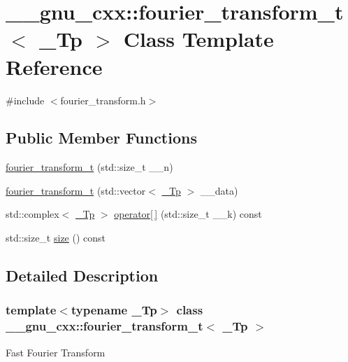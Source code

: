 \hypertarget{class____gnu__cxx_1_1fourier__transform__t}{}\section{\+\_\+\+\_\+gnu\+\_\+cxx\+:\+:fourier\+\_\+transform\+\_\+t$<$ \+\_\+\+Tp $>$ Class Template Reference}
\label{class____gnu__cxx_1_1fourier__transform__t}


{\ttfamily \#include $<$fourier\+\_\+transform.\+h$>$}

\subsection*{Public Member Functions}
\begin{DoxyCompactItemize}
\item 
\hyperlink{class____gnu__cxx_1_1fourier__transform__t_ae9d6b51de92d52ba301457c4a9680a64}{fourier\+\_\+transform\+\_\+t} (std\+::size\+\_\+t \+\_\+\+\_\+n)
\item 
\hyperlink{class____gnu__cxx_1_1fourier__transform__t_abb69842c2d297492cc5cd22e4b0ee34e}{fourier\+\_\+transform\+\_\+t} (std\+::vector$<$ \hyperlink{namespace____gnu__cxx_a3b19a9c800ca194374ef9172290f7d79}{\+\_\+\+Tp} $>$ \+\_\+\+\_\+data)
\item 
std\+::complex$<$ \hyperlink{namespace____gnu__cxx_a3b19a9c800ca194374ef9172290f7d79}{\+\_\+\+Tp} $>$ \hyperlink{class____gnu__cxx_1_1fourier__transform__t_a1b39e5c1042bdb5b60d4f833d5661ed8}{operator\mbox{[}$\,$\mbox{]}} (std\+::size\+\_\+t \+\_\+\+\_\+k) const
\item 
std\+::size\+\_\+t \hyperlink{class____gnu__cxx_1_1fourier__transform__t_a667f8cb207f9d8e4c8643fe0bf165ff4}{size} () const
\end{DoxyCompactItemize}


\subsection{Detailed Description}
\subsubsection*{template$<$typename \+\_\+\+Tp$>$\newline
class \+\_\+\+\_\+gnu\+\_\+cxx\+::fourier\+\_\+transform\+\_\+t$<$ \+\_\+\+Tp $>$}

Fast Fourier Transform

